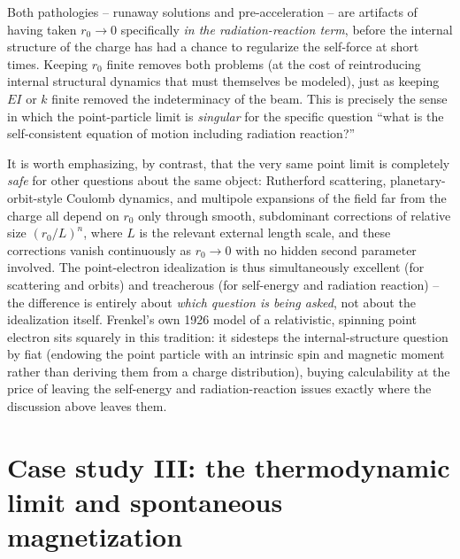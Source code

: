 \documentclass[11pt]{article}
\begin{document}
Both pathologies -- runaway solutions and pre-acceleration -- are artifacts of having taken $r_0\to0$ specifically \emph{in the radiation-reaction term}, before the internal structure of the charge has had a chance to regularize the self-force at short times. Keeping $r_0$ finite removes both problems (at the cost of reintroducing internal structural dynamics that must themselves be modeled), just as keeping $EI$ or $k$ finite removed the indeterminacy of the beam. This is precisely the sense in which the point-particle limit is \emph{singular} for the specific question ``what is the self-consistent equation of motion including radiation reaction?''

It is worth emphasizing, by contrast, that the very same point limit is completely \emph{safe} for other questions about the same object: Rutherford scattering, planetary-orbit-style Coulomb dynamics, and multipole expansions of the field far from the charge all depend on $r_0$ only through smooth, subdominant corrections of relative size $(r_0/L)^n$, where $L$ is the relevant external length scale, and these corrections vanish continuously as $r_0\to0$ with no hidden second parameter involved. The point-electron idealization is thus simultaneously excellent (for scattering and orbits) and treacherous (for self-energy and radiation reaction) -- the difference is entirely about \emph{which question is being asked}, not about the idealization itself. Frenkel's own 1926 model of a relativistic, spinning point electron sits squarely in this tradition: it sidesteps the internal-structure question by fiat (endowing the point particle with an intrinsic spin and magnetic moment rather than deriving them from a charge distribution), buying calculability at the price of leaving the self-energy and radiation-reaction issues exactly where the discussion above leaves them.

\section{Case study III: the thermodynamic limit and spontaneous magnetization}
\end{document}
